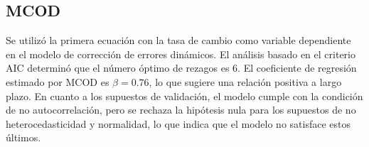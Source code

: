 \documentclass[11pt]{article}
\begin{document}
\subsection{MCOD}
\begin{flushleft}
    Se utilizó la primera ecuación con la tasa de cambio como variable dependiente en el modelo de corrección de errores dinámicos. El análisis basado en el criterio AIC determinó que el número óptimo de rezagos es 6. El coeficiente de regresión estimado por MCOD es $\beta=0.76$, lo que sugiere una relación positiva a largo plazo.
    En cuanto a los supuestos de validación, el modelo cumple con la condición de no autocorrelación, pero se rechaza la hipótesis nula para los supuestos de no heterocedasticidad y normalidad, lo que indica que el modelo no satisface estos últimos.
\end{flushleft}
\end{document}
